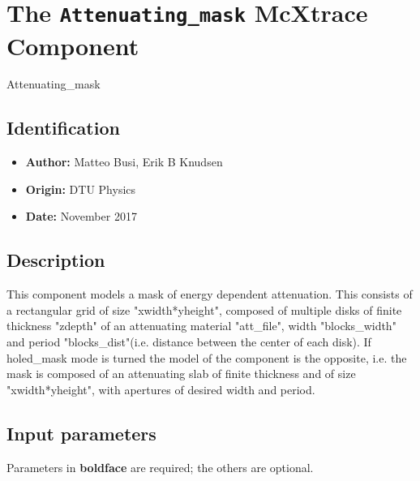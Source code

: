 \section{The \texttt{Attenuating\_mask} McXtrace Component}
Attenuating\_mask

\subsection*{Identification}
\begin{itemize}
  \item \textbf{Author:} Matteo Busi, Erik B Knudsen
  \item \textbf{Origin:} DTU Physics
  \item \textbf{Date:} November 2017
\end{itemize}

\subsection*{Description}
This component models a mask of energy dependent attenuation. This consists of a rectangular grid of size "xwidth*yheight", composed of multiple disks of finite thickness "zdepth" of an attenuating material "att\_file", width "blocks\_width" and period "blocks\_dist"(i.e. distance between the center of each disk). If holed\_mask mode is turned the model of the component is the opposite, i.e. the mask is composed of an attenuating slab of finite thickness and of size "xwidth*yheight", with apertures of desired width and period.

\subsection*{Input parameters}
Parameters in \textbf{boldface} are required; the others are optional.

